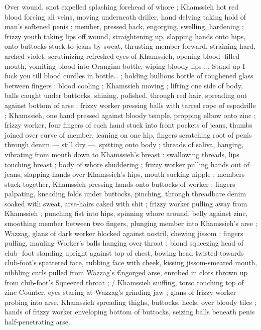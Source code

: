 Over wound, snot expelled splashing forehead of whore ; Khamssieh 
hot red blood forcing all veins, moving underneath driller, hand 
delving taking hold of man's softened penis ; member, pressed back, 
engorging, swelling, hardening ; frizzy youth taking lips off wound, 
straightening up, slapping hands onto hips, onto buttocks stuck to 
jeans by sweat, thrusting member forward, straining hard, arched 
violet, scrutinizing refreshed eyes of Khamssieh, opening blood- 
filled mouth, vomiting blood into Orangina bottle, wiping bloody lips 
:{\gl}., Stand up{\td} I fuck you till blood curdles in bottle{\ldots} ; holding 
bulbous bottle of roughened glass between fingers : blood cooling ; 
Khamssieh moving ; lifting one side of body, balls caught under 
buttocks. shining, polished, through red hair, spreading out against 
bottom of arse ; frizzy worker pressing balls with tarred rope of 
espadrille ; Khamssieh, one hand pressed against bloody temple, 
propping elbow onto zinc ; frizzy worker, four fingers of each hand 
stuck into front pockets of jeans, thumbs joined over curve of 
member, leaning on one hip, fingers scratching root of penis through 
denim --- still dry ---, spitting onto body ; threads of saliva, hanging, 
vibrating from mouth down to Khamssieh's breast : swallowing 
threads, lips touching breast ; body of whore shuddering ; frizzy 
worker pulling hands out of jeans, slapping hands over Khamssieh's 
hips, mouth sucking nipple ; members stuck together, Khamssieh 
pressing hands onto buttocks of worker ; fingers palpating, kneading 
folds under buttocks, pinching, through threadbare denim soaked 
with sweat, arse-hairs caked with shit ; frizzy worker pulling away 
from Khamssieh ; punching fist into hips, spinning whore around, 
belly against zinc, smoothing member between two fingers, plunging 
member into Khamssieh's arse ; Wazzag, glans of dark worker 
blocked against nostril, chewing jissom ; fingers pulling, mauling 
Worker's balls hanging over throat ; blond squeezing head of club- 
foot standing upright against top of chest, bowing head twisted 
towards club-foot's spattered face, rubbing face with cheek, kissing 
jissom-smeared mouth, nibbling curls pulled from Wazzag's 
€ngorged arse, enrobed in clots thrown up from club-foot's 
Squeezed throat ; {\slash} Khamssieh sniffing, torso touching top of zinc 
Counter, eyes staring at Wazzag's grinding jaw ; glans of frizzy 
worker probing into arse, Khamssieh spreading thighs, buttocks. 
heels, over bloody tiles ; hands of frizzy worker enveloping bottom 
of buttocks, seizing balls beneath penis half-penetrating arse. 
